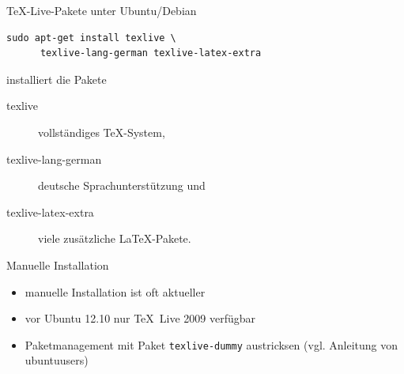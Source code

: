 \begin{Frame}[fragile]{\TeX-Live-Pakete unter Ubuntu/Debian}
  \begin{lstlisting}[gobble=4,language={}]
    sudo apt-get install texlive \
      texlive-lang-german texlive-latex-extra
  \end{lstlisting}

  installiert die Pakete

  \begin{description}
    \item[texlive] vollständiges \TeX-System, 
    \item[texlive-lang-german] deutsche Sprachunterstützung und
    \item[texlive-latex-extra] viele zusätzliche \LaTeX-Pakete.
  \end{description}

  \begin{alertblock}{Manuelle Installation}
    \begin{itemize}
      \item manuelle Installation ist oft aktueller
      \item vor Ubuntu 12.10 nur \TeX\ Live 2009 verfügbar
      \item Paketmanagement mit Paket \texttt{texlive-dummy} austricksen
        (vgl. Anleitung von ubuntuusers)
    \end{itemize}
  \end{alertblock}
\end{Frame}

